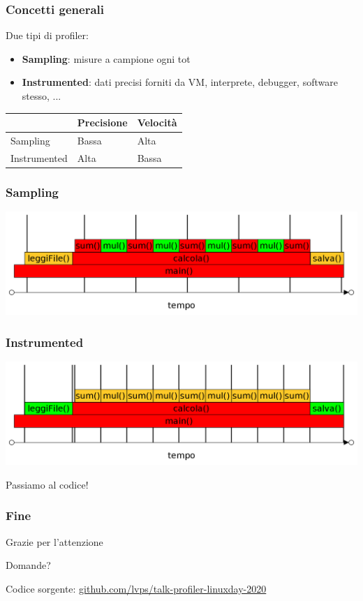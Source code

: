 \documentclass[aspectratio=169]{beamer}
\begin{document}
\begin{frame}
	\frametitle{Concetti generali}
	Due tipi di profiler:
	\begin{itemize}
		\item \textbf{Sampling}: misure a campione ogni tot
		\item \textbf{Instrumented}: dati precisi forniti da VM, interprete, debugger, software stesso, ...
	\end{itemize}

	\begin{table}[htbp]
		\def\arraystretch{1.8}%
		\begin{tabular}{l l l}
			             & Precisione & Velocità \\ \hline
			Sampling     & Bassa      & Alta     \\ \hline
			Instrumented & Alta       & Bassa    \\ \hline
		\end{tabular}
	\end{table}
\end{frame}

\begin{frame}
	\frametitle{Sampling}
	\centering
	\includegraphics[width=\linewidth]{sampling}
\end{frame}

\begin{frame}
\frametitle{Instrumented}
\centering
\includegraphics[width=\linewidth]{instrumented}
\end{frame}


\begin{frame}
	\Huge\centering Passiamo al codice!
\end{frame}

	\begin{frame}
		\frametitle{Fine}
		{\centering\Huge Grazie per l'attenzione\par}
		{\centering\large Domande?\par}
		
		\vspace{5em}
		Codice sorgente: \href{https://github.com/lvps/talk-profiler-linuxday-2020}{github.com/lvps/talk-profiler-linuxday-2020}
	\end{frame}
	
\end{document}
